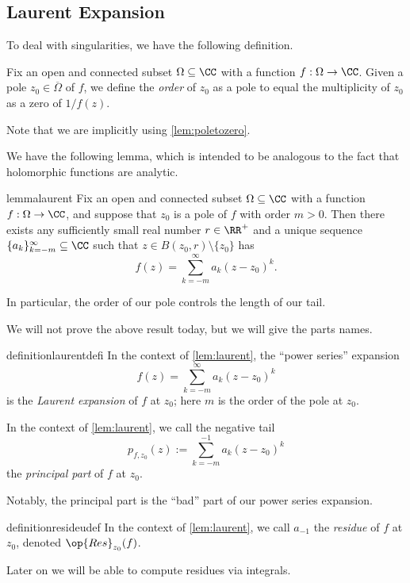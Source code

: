 \subsection{Laurent Expansion}
To deal with singularities, we have the following definition.
\begin{definition}[Order]
	Fix an open and connected subset $\Omega\subseteq\CC$ with a function $f:\Omega\to\CC$. Given a pole $z_0\in\overline\Omega$ of $f$, we define the \textit{order} of $z_0$ as a pole to equal the multiplicity of $z_0$ as a zero of $1/f(z)$.
\end{definition}
Note that we are implicitly using \autoref{lem:poletozero}.

We have the following lemma, which is intended to be analogous to the fact that holomorphic functions are analytic.
\begin{restatable}{lemma}{laurent} \label{lem:laurent}
	Fix an open and connected subset $\Omega\subseteq\CC$ with a function $f:\Omega\to\CC$, and suppose that $z_0$ is a pole of $f$ with order $m>0$. Then there exists any sufficiently small real number $r\in\RR^+$ and a unique sequence $\{a_k\}_{k=-m}^\infty\subseteq\CC$ such that $z\in B(z_0,r)\setminus\{z_0\}$ has
	\[f(z)=\sum_{k=-m}^\infty a_k(z-z_0)^k.\]
\end{restatable}
\noindent In particular, the order of our pole controls the length of our tail.

We will not prove the above result today, but we will give the parts names.
\begin{restatable}{definition}{laurentdefi}
	In the context of \autoref{lem:laurent}, the ``power series'' expansion
	\[f(z)=\sum_{k=-m}^\infty a_k(z-z_0)^k\]
	is the \textit{Laurent expansion} of $f$ at $z_0$; here $m$ is the order of the pole at $z_0$.
\end{restatable}
\begin{definition}
	In the context of \autoref{lem:laurent}, we call the negative tail
	\[p_{f,z_0}(z):=\sum_{k=-m}^{-1}a_k(z-z_0)^k\]
	the \textit{principal part} of $f$ at $z_0$.
\end{definition}
Notably, the principal part is the ``bad'' part of our power series expansion.
\begin{restatable}[Residue]{definition}{resideudef}
	In the context of \autoref{lem:laurent}, we call $a_{-1}$ the \textit{residue} of $f$ at $z_0$, denoted $\op{Res}_{z_0}(f)$.
\end{restatable}
\noindent Later on we will be able to compute residues via integrals.